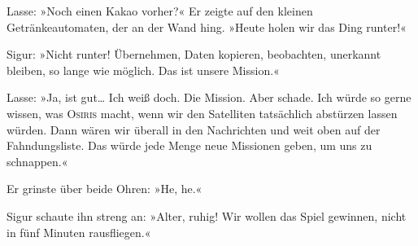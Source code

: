 Lasse: »Noch einen Kakao vorher?« Er zeigte auf den kleinen Getränkeautomaten, der an der Wand hing. »Heute holen wir das Ding runter!«

Sigur: »Nicht runter! Übernehmen, Daten kopieren, beobachten, unerkannt bleiben, so lange wie möglich.
Das ist unsere Mission.«

Lasse: »Ja, ist gut… Ich weiß doch.
Die Mission.
Aber schade.
Ich würde so gerne wissen, was \textsc{Osiris} macht, wenn wir den Satelliten tatsächlich abstürzen lassen würden.
Dann wären wir überall in den Nachrichten und weit oben auf der Fahndungsliste.
Das würde jede Menge neue Missionen geben, um uns zu schnappen.«

Er grinste über beide Ohren: »He, he.«

Sigur schaute ihn streng an: »Alter, ruhig! Wir wollen das Spiel gewinnen, nicht in fünf Minuten rausfliegen.«

